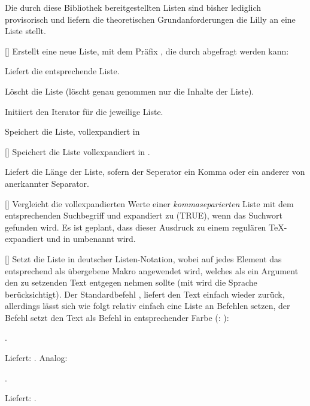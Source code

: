 Die durch diese Bibliothek bereitgestellten Listen sind bisher lediglich provisorisch und liefern die theoretischen Grundanforderungen die Lilly an eine Liste stellt.

%
%
%

[]
Erstellt eine neue Liste, mit dem Präfix , die durch  abgefragt werden kann:

Liefert die entsprechende Liste.

Löscht die Liste (löscht genau genommen nur die Inhalte der Liste).

Initiiert den Iterator für die jeweilige Liste.

Speichert die Liste, vollexpandiert in 

[]
Speichert die Liste vollexpandiert in .

Liefert die Länge der Liste, sofern der Seperator ein Komma oder ein anderer von  anerkannter Separator.

%
%
%

[]
Vergleicht die vollexpandierten Werte einer \emph{kommaseparierten} Liste mit dem entsprechenden Suchbegriff und expandiert zu  (TRUE), wenn das Suchwort gefunden wird. Es ist geplant, dass dieser Ausdruck zu einem regulären TeX- expandiert und in  umbenannt wird.

%
%
%

[]
Setzt die Liste in deutscher Listen-Notation, wobei auf jedes Element das entsprechend als  übergebene Makro angewendet wird, welches als ein Argument den zu setzenden Text entgegen nehmen sollte (mit  wird die Sprache berücksichtigt). Der Standardbefehl , liefert den Text einfach wieder zurück, allerdings lässt sich wie folgt relativ einfach eine Liste an Befehlen setzen, der Befehl  setzt den Text als Befehl in entsprechender Farbe (: ):
\begin{latex*}
.
\end{latex*}
Liefert: .
Analog:
\begin{latex*}[morekeywords={[5]{\\meinBefehl}}]
\newcommand{\meinBefehl}[1]{Jeah (\textit{#1})}
.
\end{latex*}\bgroup%
\newcommand{\meinBefehl}[1]{Jeah (\textit{#1})}%
Liefert: .\egroup

